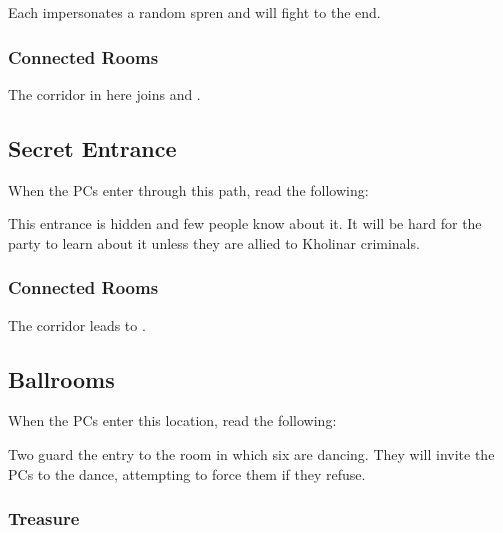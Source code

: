 Each \enemyCultistOfMoments{} impersonates a random spren and will fight to the end.

\subsubsection{Connected Rooms}

The corridor in here joins  and .


\subsection{Secret Entrance}
\label{ssec:kholinarPalaceRoomsSecretEntrance}

When the PCs enter through this path, read the following:


This entrance is hidden and few people know about it. It will be hard for the party to learn about it unless they are allied to Kholinar criminals.

\subsubsection{Connected Rooms}

The corridor leads to .



\subsection{Ballrooms}
\label{ssec:kholinarPalaceRoomsBallrooms}

When the PCs enter this location, read the following:


Two \enemyQueensGuard{} guard the entry to the room in which six \enemyRevelerMusical{} are dancing. They will invite the PCs to the dance, attempting to force them if they refuse.

\subsubsection{Treasure}

